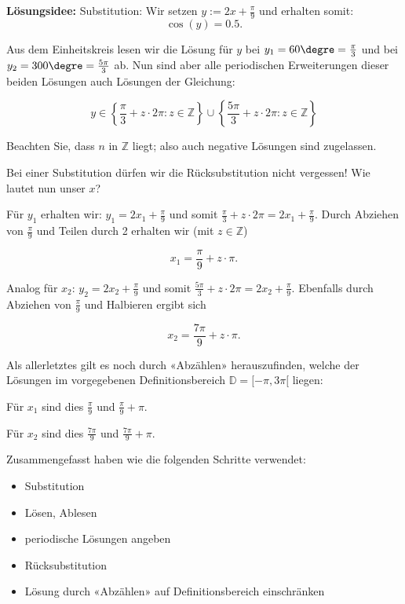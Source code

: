\textbf{Lösungsidee:} Substitution:
Wir setzen $y := 2x + \frac{\pi}{9}$ und erhalten somit:
$$\cos(y) = 0.5.$$

Aus dem Einheitskreis lesen wir die Lösung für $y$ bei $y_1=60\degre = \frac{\pi}{3}$ und bei $y_2=300\degre = \frac{5\pi}{3}$ ab. Nun sind aber alle periodischen Erweiterungen dieser beiden Lösungen auch Lösungen der Gleichung:

$$y \in \left\{\frac{\pi}{3} + z\cdot{}2\pi: z\in\mathbb{Z}\right\} \cup \left\{\frac{5\pi}{3}+ z\cdot{}2\pi: z\in\mathbb{Z}\right\}$$

Beachten Sie, dass $n$ in $\mathbb{Z}$ liegt; also auch negative Lösungen sind zugelassen.

Bei einer Substitution dürfen wir die Rücksubstitution nicht vergessen! Wie lautet nun unser $x$?

Für $y_1$ erhalten wir: $y_1= 2x_1 + \frac{\pi}{9}$ und somit $\frac{\pi}{3} + z\cdot{}2\pi = 2x_1 + \frac{\pi}{9}$. Durch Abziehen von $\frac{\pi}{9}$ und Teilen durch 2 erhalten wir (mit $z\in\mathbb{Z}$)

$$x_1 = \frac{\pi}{9} + z\cdot{}\pi.$$

Analog für $x_2$: $y_2 = 2x_2 + \frac{\pi}{9}$ und somit $\frac{5\pi}{3} + z\cdot{}2\pi = 2x_2 + \frac{\pi}{9}$. Ebenfalls durch Abziehen von $\frac{\pi}{9}$ und Halbieren ergibt sich

$$x_2 = \frac{7\pi}{9} + z\cdot{}\pi.$$

Als allerletztes gilt es noch durch «Abzählen» herauszufinden, welche der Lösungen im vorgegebenen Definitionsbereich $\mathbb{D} = [-\pi, 3\pi[$ liegen:

    Für $x_1$ sind dies $\frac{\pi}{9}$ und $\frac{\pi}{9} + \pi$.

    Für $x_2$ sind dies $\frac{7\pi}{9}$ und $\frac{7\pi}{9} + \pi$.
   
    Zusammengefasst haben wie die folgenden Schritte verwendet:
    \begin{rezept}{}{}
\begin{itemize}
    \item Substitution
    \item Lösen, Ablesen
    \item periodische Lösungen angeben
    \item Rücksubstitution
    \item Lösung durch «Abzählen» auf Definitionsbereich einschränken
\end{itemize}
\end{rezept}%
\newpage


